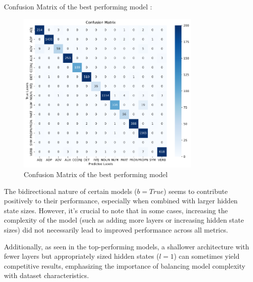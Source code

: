 Confusion Matrix of the best performing model : 

\begin{figure}[h]
\centering
\includegraphics[width=0.8\textwidth]{../pictures/ConfusionMatrixBestRNN.png}
\caption{Confusion Matrix of the best performing model}
\end{figure}

The bidirectional nature of certain models ($b=True$) seems to contribute positively to their performance, especially when combined with larger hidden state sizes. However, it's crucial to note that in some cases, increasing the complexity of the model (such as adding more layers or increasing hidden state sizes) did not necessarily lead to improved performance across all metrics.

Additionally, as seen in the top-performing models, a shallower architecture with fewer layers but appropriately sized hidden states ($l=1$) can sometimes yield competitive results, emphasizing the importance of balancing model complexity with dataset characteristics.
